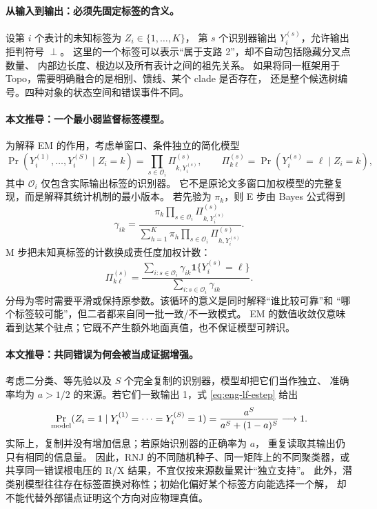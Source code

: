 \documentclass[UTF8,11pt,fontset=fandol]{ctexart}
\theoremstyle{remark}
\numberwithin{equation}{section}
\begin{document}
\paragraph{从输入到输出：必须先固定标签的含义。}
设第 $i$ 个表计的未知标签为 $Z_i\in\{1,\ldots,K\}$，
第 $s$ 个识别器输出 $Y_i^{(s)}$，允许输出拒判符号 $\perp$。
这里的一个标签可以表示“属于支路 2”，却不自动包括隐藏分叉点数量、
内部边长度、根边以及所有表计之间的祖先关系。
如果将同一框架用于 Topo，需要明确融合的是相别、馈线、某个 clade 是否存在，
还是整个候选树编号。四种对象的状态空间和错误事件不同。

\paragraph{本文推导：一个最小弱监督标签模型。}
为解释 EM 的作用，考虑单窗口、条件独立的简化模型
\begin{equation}
 \Pr(Y_i^{(1)},\ldots,Y_i^{(S)}\mid Z_i=k)
 =\prod_{s\in\mathcal O_i}\Pi^{(s)}_{k,Y_i^{(s)}},
 \qquad \Pi^{(s)}_{k\ell}=\Pr(Y_i^{(s)}=\ell\mid Z_i=k),
 \label{eq:eng-lf-model}
\end{equation}
其中 $\mathcal O_i$ 仅包含实际输出标签的识别器。
它不是原论文多窗口加权模型的完整复现，而是解释其统计机制的最小版本。
若先验为 $\pi_k$，则 E 步由 Bayes 公式得到
\begin{equation}
 \gamma_{ik}=
 \frac{\pi_k\prod_{s\in\mathcal O_i}\Pi^{(s)}_{k,Y_i^{(s)}}}
 {\sum_{h=1}^{K}\pi_h\prod_{s\in\mathcal O_i}\Pi^{(s)}_{h,Y_i^{(s)}}}.
 \label{eq:eng-lf-estep}
\end{equation}
M 步把未知真标签的计数换成责任度加权计数：
\begin{equation}
 \Pi^{(s)}_{k\ell}
 =\frac{\sum_{i:s\in\mathcal O_i}\gamma_{ik}
                 \mathbf 1\{Y_i^{(s)}=\ell\}}
        {\sum_{i:s\in\mathcal O_i}\gamma_{ik}}.
 \label{eq:eng-lf-mstep}
\end{equation}
分母为零时需要平滑或保持原参数。该循环的意义是同时解释“谁比较可靠”和
“哪个标签较可能”，但二者都来自同一批一致/不一致模式。
EM 的数值收敛仅意味着到达某个驻点；它既不产生额外地面真值，也不保证模型可辨识。

\paragraph{本文推导：共同错误为何会被当成证据增强。}
考虑二分类、等先验以及 $S$ 个完全复制的识别器，模型却把它们当作独立、
准确率均为 $a>1/2$ 的来源。若它们一致输出 1，式 \eqref{eq:eng-lf-estep} 给出
\begin{equation}
 \Pr_{\rm model}(Z_i=1\mid Y_i^{(1)}=\cdots=Y_i^{(S)}=1)
 =\frac{a^S}{a^S+(1-a)^S}\longrightarrow 1.
 \label{eq:eng-duplicate}
\end{equation}
实际上，复制并没有增加信息；若原始识别器的正确率为 $a$，
重复读取其输出仍只有相同的信息量。
因此，RNJ 的不同随机种子、同一矩阵上的不同聚类器，或共享同一错误根电压的
R/X 结果，不宜仅按来源数量累计“独立支持”。
此外，潜类别模型往往存在标签置换对称性；初始化偏好某个标签方向能选择一个解，
却不能代替外部锚点证明这个方向对应物理真值。
\end{document}
